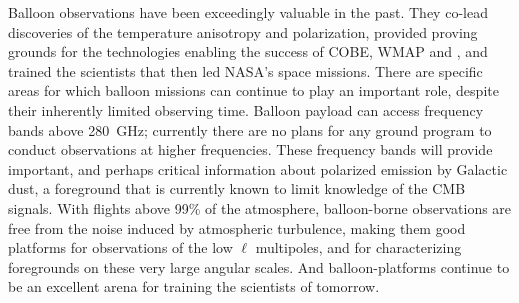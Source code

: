 \documentclass[PICOReport.tex]{subfiles}
\begin{document}


Balloon observations have been exceedingly valuable in the past. They co-lead discoveries of the temperature anisotropy and polarization, provided proving grounds for the technologies enabling the success of COBE, WMAP and \planck , and trained the scientists that then led NASA's space missions. There are specific areas for which balloon missions can continue to play an important role, despite their inherently limited observing time. Balloon payload can access frequency bands above 280~GHz; currently there are no plans for any ground program to conduct observations at higher frequencies. These frequency bands will provide important, and perhaps critical information about polarized emission by  Galactic dust, a foreground that is currently known to limit knowledge of the CMB signals.  With flights above 99\% of the atmosphere, balloon-borne observations are free from the noise induced by atmospheric turbulence, making them good platforms for observations of the low $\ell$ multipoles, and for characterizing foregrounds on these very large angular scales. And balloon-platforms continue to be an excellent arena for training the scientists of tomorrow. 

\end{document}
